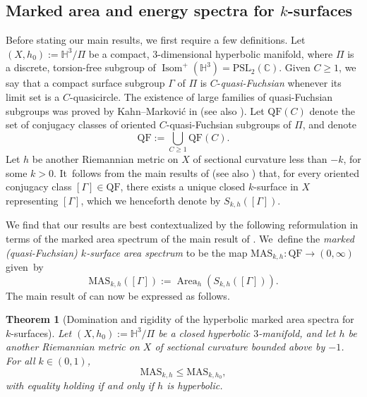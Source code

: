 \documentclass[10pt]{amsart}
\newcommand{\ksurface}{$k$\nobreakdash-surface\xspace}
\newcommand{\ksurfaces}{$k$\nobreakdash-surfaces\xspace}
\theoremstyle{plain}
\newtheorem{theorem}{Theorem}[section]
\theoremstyle{definition}
\newcommand\PSLc{\mathrm{PSL}_2(\mathbb{C})}
\newcommand\Hyp{\mathbb{H}^3}
\newcommand{\QF}{\mathrm{QF}}
\DeclareMathOperator{\Isom}{Isom}
\DeclareMathOperator{\Area}{Area}
\begin{document}
\subsection{Marked area and energy spectra for \ksurfaces}

Before stating our main results, we first require a few definitions. Let $(X,h_0):=\Hyp/\Pi$ be a compact, $3$\nobreakdash-dimensional hyperbolic manifold, where $\Pi$ is a discrete, torsion-free subgroup of $\Isom^+(\Hyp)=\PSLc$. Given $C\geq 1$, we say that a compact surface subgroup $\Gamma$ of $\Pi$ is $C$-\emph{quasi-Fuchsian} whenever its limit set is a $C$-quasicircle. The existence of large families of quasi-Fuchsian subgroups was proved by Kahn--Markovi\'c in \cite{KM1,KM2} (see also \cite{HamenstadtKM,Kahn_Labourie_Mozes}). Let $\QF(C)$ denote the set of conjugacy classes of oriented $C$-quasi-Fuchsian subgroups of $\Pi$, and denote
\begin{equation*}
\QF:=\bigcup_{C\geq 1}\QF(C).
\end{equation*}
Let $h$ be another Riemannian metric on $X$ of sectional curvature less than $-k$, for some $k>0$. It~follows from the main results of \cite{LabourieInvent} (see also \cite{Smith_asymp}) that, for every oriented conjugacy class $[\Gamma]\in\QF$, there exists a unique closed \ksurface in $X$ representing $[\Gamma]$, which we henceforth denote by $S_{k,h}([\Gamma])$.

We find that our results are best contextualized by the following reformulation in terms of the marked area spectrum of the main result of \cite{ALS}. We~define the \emph{marked (quasi-Fuchsian) \ksurface area spectrum} to be the map $\text{MAS}_{k,h}:\QF\to(0,\infty)$ given~by
\begin{equation*}
\text{MAS}_{k,h}([\Gamma]) := \Area_h(S_{k,h}([\Gamma])).
\end{equation*}
The main result of \cite{ALS} can now be expressed as follows.

\begin{theorem}[Domination and rigidity of the hyperbolic marked area spectra for \ksurfaces]\label{th.rigidity_area}
Let $(X,h_0):=\Hyp/\Pi$ be a closed hyperbolic $3$\nobreakdash-manifold, and let $h$ be another Riemannian metric on $X$ of sectional curvature bounded above by $-1$. For all $k\in(0,1)$,
\begin{equation}\label{eqn.rigidity_area}
\mathrm{MAS}_{k,h}\leq\mathrm{MAS}_{k,h_0},
\end{equation}
with equality holding if and only if $h$ is hyperbolic.
\end{theorem}
\end{document}
